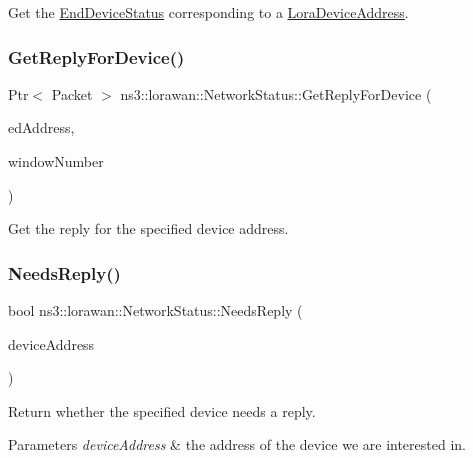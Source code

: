 Get the \hyperlink{classns3_1_1lorawan_1_1EndDeviceStatus}{End\+Device\+Status} corresponding to a \hyperlink{classns3_1_1lorawan_1_1LoraDeviceAddress}{Lora\+Device\+Address}. \mbox{\label{classns3_1_1lorawan_1_1NetworkStatus_aea166a6fa4379e993de7e309db64c9d5}} 
\subsubsection{\texorpdfstring{Get\+Reply\+For\+Device()}{GetReplyForDevice()}}
{\footnotesize\ttfamily Ptr$<$ Packet $>$ ns3\+::lorawan\+::\+Network\+Status\+::\+Get\+Reply\+For\+Device (\begin{DoxyParamCaption}\item[{\hyperlink{classns3_1_1lorawan_1_1LoraDeviceAddress}{Lora\+Device\+Address}}]{ed\+Address,  }\item[{int}]{window\+Number }\end{DoxyParamCaption})}

Get the reply for the specified device address. \mbox{\label{classns3_1_1lorawan_1_1NetworkStatus_a5175d3ffc372da6af985f7f32eb9b910}} 
\subsubsection{\texorpdfstring{Needs\+Reply()}{NeedsReply()}}
{\footnotesize\ttfamily bool ns3\+::lorawan\+::\+Network\+Status\+::\+Needs\+Reply (\begin{DoxyParamCaption}\item[{\hyperlink{classns3_1_1lorawan_1_1LoraDeviceAddress}{Lora\+Device\+Address}}]{device\+Address }\end{DoxyParamCaption})}

Return whether the specified device needs a reply.


\begin{DoxyParams}{Parameters}
{\em device\+Address} & the address of the device we are interested in. \\
\hline
\end{DoxyParams}
\mbox{\label{classns3_1_1lorawan_1_1NetworkStatus_a3145ab9250630584f436fad43ed1df0d}} 
